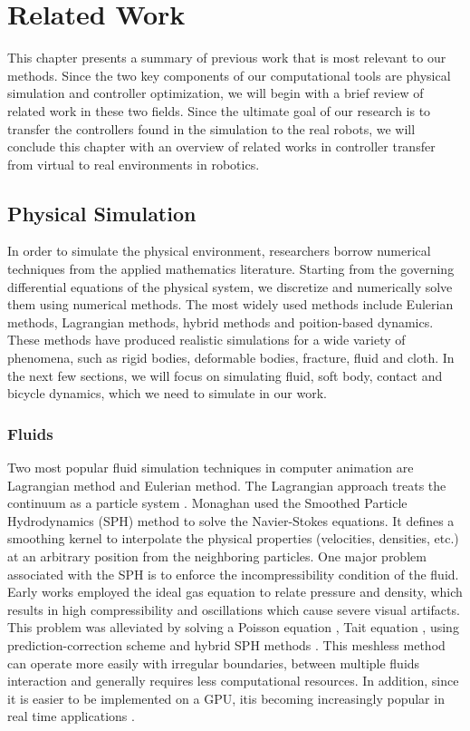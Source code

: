 \chapter{Related Work}

This chapter presents a summary of previous work that is most relevant to our methods. Since the two key components of our computational tools are physical simulation and controller optimization, we will begin with a brief review of related work in these two fields. Since the ultimate goal of our research is to transfer the controllers found in the simulation to the real robots, we will conclude this chapter with an overview of related works in controller transfer from virtual to real environments in robotics.

\section{Physical Simulation}
In order to simulate the physical environment, researchers borrow numerical techniques from the applied mathematics literature. Starting from the governing differential equations of the physical system, we discretize and numerically solve them using numerical methods. The most widely used methods include Eulerian methods, Lagrangian methods, hybrid methods and poition-based dynamics. These methods have produced realistic simulations for a wide variety of phenomena, such as rigid bodies, deformable bodies, fracture, fluid and cloth. In the next few sections, we will focus on simulating fluid, soft body, contact and bicycle dynamics, which we need to simulate in our work.

\subsection{Fluids}
Two most popular fluid simulation techniques in computer animation are Lagrangian method and Eulerian method. The Lagrangian approach treats the continuum as a particle system \cite{}. Monaghan\cite{} used the Smoothed Particle Hydrodynamics (SPH) method to solve the Navier-Stokes equations. It defines a smoothing kernel to interpolate the physical
properties (velocities, densities, etc.) at an arbitrary position
from the neighboring particles. One major problem associated with the SPH is to enforce the  incompressibility condition of the fluid. Early works \cite{} employed the ideal gas equation to relate pressure and density, which results in high compressibility and oscillations which cause severe visual artifacts. This problem was alleviated by solving a Poisson equation \cite{}, Tait equation \cite{}, using prediction-correction scheme and hybrid SPH methods \cite{}. This meshless method can operate more easily with irregular boundaries, between
multiple fluids interaction and generally requires
less computational resources. In addition, since it is easier to be implemented on a GPU, itis becoming increasingly popular in real time applications \cite{}.

